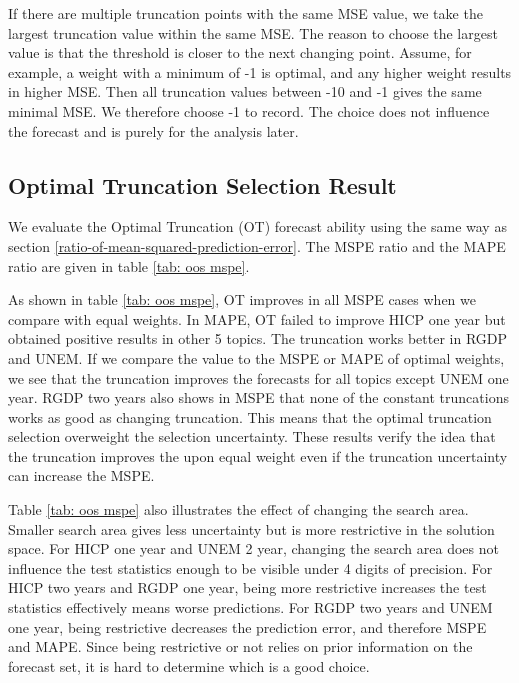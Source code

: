 \documentclass[11pt]{article}
\begin{document}
If there are multiple truncation points with the same MSE value, we take the largest truncation value within the same MSE. The reason to choose the largest value is that the threshold is closer to the next changing point. Assume, for example, a weight with a minimum of -1 is optimal, and any higher weight results in higher MSE. Then all truncation values between -10 and -1 gives the same minimal MSE. We therefore choose -1 to record. The choice does not influence the forecast and is purely for the analysis later.

\subsection{Optimal Truncation Selection Result}\label{out-of-sample-truncation-result}
We evaluate the Optimal Truncation (OT) forecast ability using the same way as section \ref{ratio-of-mean-squared-prediction-error}. The MSPE ratio and the MAPE ratio are given in table \ref{tab: oos mspe}.

As shown in table \ref{tab: oos mspe}, OT improves in all MSPE cases when we compare with equal weights. In MAPE, OT failed to improve HICP one year but obtained positive results in other 5 topics. The truncation works better in RGDP and UNEM. If we compare the value to the MSPE or MAPE of optimal weights, we see that the truncation improves the forecasts for all topics except UNEM one year. RGDP two years also shows in MSPE that none of the constant truncations works as good as changing truncation. This means that the optimal truncation selection overweight the selection uncertainty. These results verify the idea that the truncation improves the upon equal weight even if the truncation uncertainty can increase the MSPE. 

Table \ref{tab: oos mspe} also illustrates the effect of changing the search area. Smaller search area gives less uncertainty but is more restrictive in the solution space. For HICP one year and UNEM 2 year, changing the search area does not influence the test statistics enough to be visible under 4 digits of precision. For HICP two years and RGDP one year, being more restrictive increases the test statistics effectively means worse predictions. For RGDP two years and UNEM one year, being restrictive decreases the prediction error, and therefore MSPE and MAPE. Since being restrictive or not relies on prior information on the forecast set, it is hard to determine which is a good choice.
\end{document}
